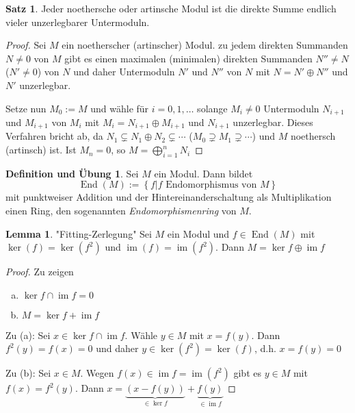 \documentclass[
twoside=semi,
fontsize=12,
DIV=12, 
cleardoublepage=current,
leqno,
headings=optiontoheadandtoc, 
toc=idx
]{scrbook}
\newcommand{\set}[1]{\left\{ #1 \right\}}
\DeclareMathOperator{\im}{im}
\DeclareMathOperator{\End}{End}
\theoremstyle{definition}
\newtheorem{satz}[definition]{Satz}
\newtheorem{lemma}[definition]{Lemma}
\newtheorem{defueb}[definition]{Definition und \"Ubung}
\begin{document}
	\begin{satz}\label{1.5.5}
		Jeder noethersche oder artinsche Modul ist die direkte Summe endlich vieler unzerlegbarer Untermoduln.
		
		\begin{proof}
			Sei $M$ ein noetherscher (artinscher) Modul. zu jedem direkten Summanden $N \neq 0$ von $M$ gibt es einen maximalen (minimalen) direkten Summanden $N'' \neq N$ ($N' \neq 0$) von $N$ und daher Untermoduln $N'$ und $N''$ von $N$ mit $N = N' \oplus N''$ und $N'$ unzerlegbar.
			
			Setze nun $M_0 := M$ und w\"ahle f\"ur $i=0,1,\dots$ solange $M_i\neq 0$ Untermoduln $N_{i+1}$ und $M_{i+1}$ von $M_i$ mit $M_i = N_{i+1} \oplus M_{i+1}$ und $N_{i+1}$ unzerlegbar. Dieses Verfahren bricht ab, da $N_1 \subsetneq N_1 \oplus N_2 \subsetneq \cdots$ ($M_0 \supsetneq M_1 \supsetneq \cdots$) und $M$ noethersch (artinsch) ist. Ist $M_n = 0$, so $\displaystyle M = \bigoplus_{i=1}^n N_i$
		\end{proof}
	\end{satz}

	\begin{defueb}\label{1.5.6}
		Sei $M$ ein Modul. Dann bildet 
			\[\End(M):= \set{f|f \textrm{ Endomorphismus von } M}\] 
			mit punktweiser Addition und der Hintereinanderschaltung als Multiplikation einen Ring, den sogenannten \emph{Endomorphismenring} von $M$.
	\end{defueb}

	\begin{lemma}\label{1.5.7}
		"Fitting-Zerlegung"\newline
		Sei $M$ ein Modul und $f \in \End(M)$ mit $\ker(f) = \ker(f^2)$ und $\im(f) = \im(f^2)$. Dann $M = \ker f \oplus \im f$
		
		\begin{proof}
			Zu zeigen
			\begin{enumerate}[(a)]
				\item $\ker f \cap \im f = 0$
				\item $M = \ker f + \im f$
			\end{enumerate}
			Zu (a): Sei $x \in \ker f \cap \im f$. W\"ahle $y \in M$ mit $x = f(y)$. Dann $f^2(y) = f(x) = 0$ und daher $y \in \ker(f^2) = \ker(f)$, d.h. $x = f(y) = 0$
			
			Zu (b): Sei $x \in M$. Wegen $f(x) \in \im f = \im(f^2)$ gibt es $y \in M$ mit $f(x) = f^2(y)$. Dann $x = \underbrace{(x - f(y))}_{\in \ker f} + \underbrace{f(y)}_{\in \im f}$
		\end{proof}
	\end{lemma}
\end{document}
